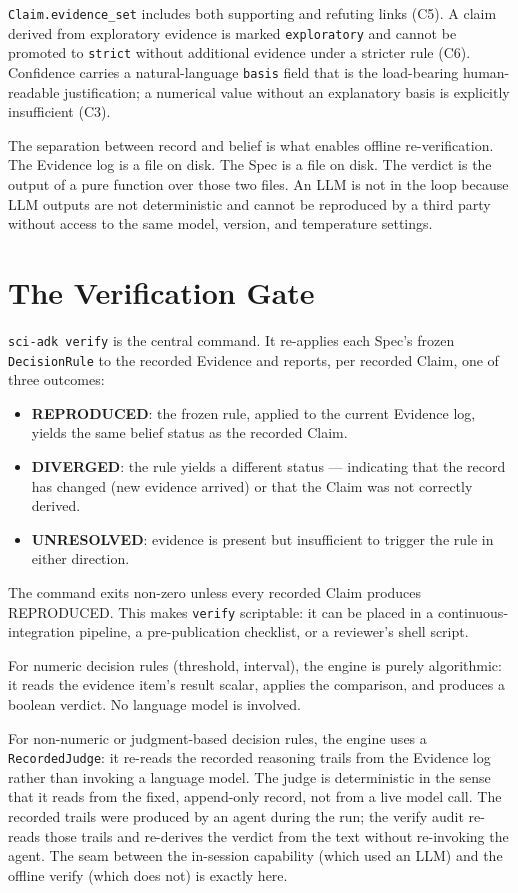 \documentclass[11pt]{article}
\begin{document}
\texttt{Claim.evidence\_set} includes both supporting and refuting links (C5). A claim derived from exploratory evidence is marked \texttt{exploratory} and cannot be promoted to \texttt{strict} without additional evidence under a stricter rule (C6). Confidence carries a natural-language \texttt{basis} field that is the load-bearing human-readable justification; a numerical value without an explanatory basis is explicitly insufficient (C3).

The separation between record and belief is what enables offline re-verification. The Evidence log is a file on disk. The Spec is a file on disk. The verdict is the output of a pure function over those two files. An LLM is not in the loop because LLM outputs are not deterministic and cannot be reproduced by a third party without access to the same model, version, and temperature settings.

\section{The Verification Gate}

\texttt{sci-adk verify} is the central command. It re-applies each Spec's frozen \texttt{DecisionRule} to the recorded Evidence and reports, per recorded Claim, one of three outcomes:

\begin{itemize}
  \item \textbf{REPRODUCED}: the frozen rule, applied to the current Evidence log, yields the same belief status as the recorded Claim.
  \item \textbf{DIVERGED}: the rule yields a different status --- indicating that the record has changed (new evidence arrived) or that the Claim was not correctly derived.
  \item \textbf{UNRESOLVED}: evidence is present but insufficient to trigger the rule in either direction.
\end{itemize}

The command exits non-zero unless every recorded Claim produces REPRODUCED. This makes \texttt{verify} scriptable: it can be placed in a continuous-integration pipeline, a pre-publication checklist, or a reviewer's shell script.

For numeric decision rules (threshold, interval), the engine is purely algorithmic: it reads the evidence item's result scalar, applies the comparison, and produces a boolean verdict. No language model is involved.

For non-numeric or judgment-based decision rules, the engine uses a \texttt{RecordedJudge}: it re-reads the recorded reasoning trails from the Evidence log rather than invoking a language model. The judge is deterministic in the sense that it reads from the fixed, append-only record, not from a live model call. The recorded trails were produced by an agent during the run; the verify audit re-reads those trails and re-derives the verdict from the text without re-invoking the agent. The seam between the in-session capability (which used an LLM) and the offline verify (which does not) is exactly here.
\end{document}
